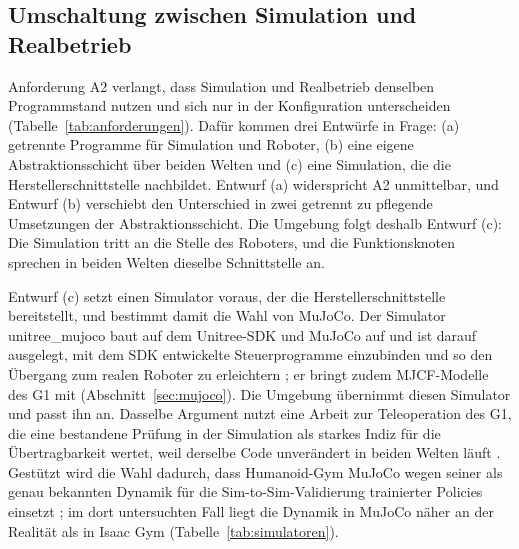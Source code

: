 \subsection{Umschaltung zwischen Simulation und Realbetrieb}
\label{sec:sim_real_schalter}
Anforderung A2 verlangt, dass Simulation und Realbetrieb denselben Programmstand nutzen und sich nur in der Konfiguration unterscheiden (Tabelle~\ref{tab:anforderungen}).
Dafür kommen drei Entwürfe in Frage: (a) getrennte Programme für Simulation und Roboter, (b) eine eigene Abstraktionsschicht über beiden Welten und (c) eine Simulation, die die Herstellerschnittstelle nachbildet.
Entwurf (a) widerspricht A2 unmittelbar, und Entwurf (b) verschiebt den Unterschied in zwei getrennt zu pflegende Umsetzungen der Abstraktionsschicht.
Die Umgebung folgt deshalb Entwurf (c): Die Simulation tritt an die Stelle des Roboters, und die Funktionsknoten sprechen in beiden Welten dieselbe Schnittstelle an.

Entwurf (c) setzt einen Simulator voraus, der die Herstellerschnittstelle bereitstellt, und bestimmt damit die Wahl von MuJoCo.
Der Simulator unitree\_mujoco baut auf dem Unitree-SDK und MuJoCo auf und ist darauf ausgelegt, mit dem SDK entwickelte Steuerprogramme einzubinden und so den Übergang zum realen Roboter zu erleichtern \cite{UnitreeMujoco}; er bringt zudem MJCF-Modelle des G1 mit \cite{UnitreeMujoco} (Abschnitt~\ref{sec:mujoco}).
Die Umgebung übernimmt diesen Simulator und passt ihn an.
Dasselbe Argument nutzt eine Arbeit zur Teleoperation des G1, die eine bestandene Prüfung in der Simulation als starkes Indiz für die Übertragbarkeit wertet, weil derselbe Code unverändert in beiden Welten läuft \cite{Durrani2026}.
Gestützt wird die Wahl dadurch, dass Humanoid-Gym MuJoCo wegen seiner als genau bekannten Dynamik für die Sim-to-Sim-Validierung trainierter Policies einsetzt \cite{Gu2024}; im dort untersuchten Fall liegt die Dynamik in MuJoCo näher an der Realität als in Isaac Gym \cite{Gu2024} (Tabelle~\ref{tab:simulatoren}).

